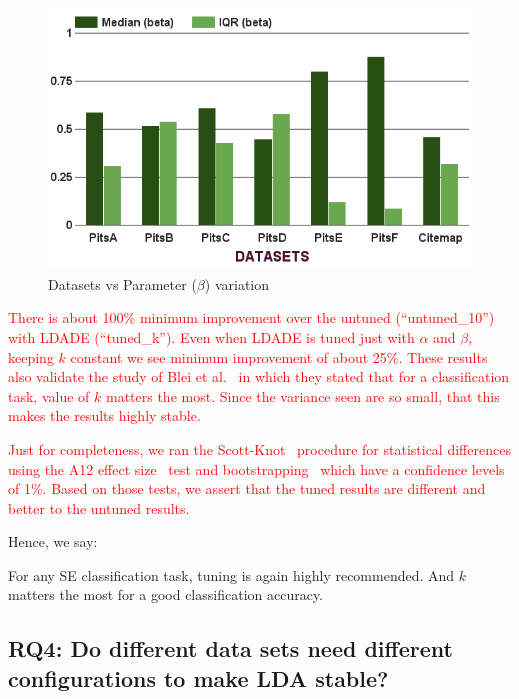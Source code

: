 \documentclass[twocolumn,5p,sort&compress]{elsarticle}
\theoremstyle{break}
\begin{document}
\begin{figure}[!t]
\begin{minipage}{.33\textwidth}
        \includegraphics[width=\linewidth]{./fig/Parameters_variation_b.png}
        \caption{Datasets vs Parameter ($\beta$) variation}
        \label{RQ3:b}
    \end{minipage}
\end{figure}

\textcolor{red}{
There is about 100\% minimum improvement over the untuned (``untuned\_10'')  with LDADE (``tuned\_k''). Even when LDADE is tuned just with $\alpha$ and $\beta$, keeping $k$ constant we see minimum improvement of about 25\%. These results also validate the study of Blei et al.~\cite{blei2003latent} in which they stated that for a classification task, value of $k$ matters the most. Since the variance seen are so small, that this makes the results highly stable.} 

\textcolor{red}{Just for completeness, we ran the Scott-Knot~\cite{jelihovschi2014scottknott} procedure for statistical differences using the A12 effect size~\cite{vargha2000critique}
test and bootstrapping~\cite{efron1994introduction} which have a confidence levels of 1\%.
Based on those tests, we assert that the tuned results are different and better to the untuned results.}

\noindent
Hence, we say:

\begin{lesson}
For any SE classification task, tuning is again highly recommended. And $k$ matters the most for a good classification accuracy.
\end{lesson}

\subsection{\textbf{RQ4: Do different data sets
      need different configurations to make LDA stable?}}
      \label{sect:diff}
\end{document}
